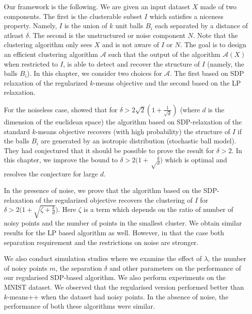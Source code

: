 \documentclass[12pt]{article}
\newcommand{\mc}{\mathcal}
\begin{document}
Our framework is the following. We are given an input dataset $X$ made of two components. The first is the clusterable subset $I$ which satisfies a niceness property. Namely, $I$ is the union of $k$ unit balls $B_i$ each separated by a distance of atleast $\delta$. The second is the unstructured or noise component $N$. Note that the clustering algorithm only sees $X$ and is not aware of $I$ or $N$. The goal is to design an efficient clustering algorithm $\mc A$ such that the output of the algorithm $\mc A(X)$ when restricted to $I$, is able to detect and recover the structure of $I$ (namely, the balls $B_i$). In this chapter, we consider two choices for $\mc A$. The first based on SDP relaxation of the regularized $k$-means objective and the second based on the LP relaxation. 

For the noiseless case, \cite{awasthi2015relax} showed that for $\delta > 2\sqrt{2}(1+\frac{1}{\sqrt d})$ (where $d$ is the dimension of the euclidean space) the algorithm based on SDP-relaxation of the standard $k$-means objective recovers (with high probability) the structure of $I$ if the balls $B_i$ are generated by an isotropic distribution (stochastic ball model). They had conjectured that it should be possible to prove the result for $\delta > 2$. In this chapter, we improve the bound to $\delta > 2\big(1+\sqrt\frac{k}{d}\big)$ which is optimal and resolves the conjecture for large $d$. 

In the presence of noise, we prove that the algorithm based on the SDP-relaxation of the regularized objective recovers the clustering of $I$ for $\delta > 2\big(1+\sqrt{\zeta + \frac{k}{d}}\big)$. Here $\zeta$ is a term which depends on the ratio of number of noisy points and the number of points in the smallest cluster. We obtain similar results for the LP based algorithm as well. However, in that the case both separation requirement and the restrictions on noise are stronger.  

We also conduct simulation studies where we examine the effect of $\lambda$, the number of noisy points $m$, the separation $\delta$ and other parameters on the performance of our regularised SDP-based algorithm. We also perform experiments on the MNIST dataset. We observed that the regularised version performed better than $k$-means++ when the dataset had noisy points. In the absence of noise, the performance of both these algorithms were similar. 
\end{document}

